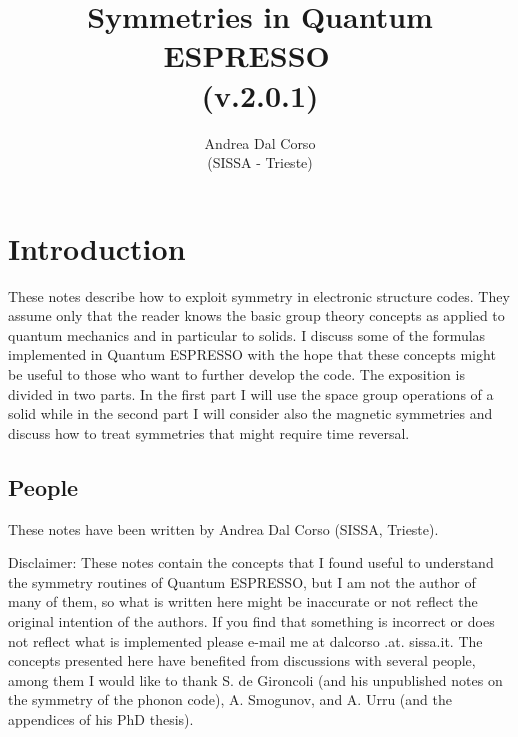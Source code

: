 \documentclass[12pt,a4paper,twoside]{report}
\def\version{2.0.1}
\begin{document}
\author{Andrea Dal Corso \\ (SISSA - Trieste)}
\date{}

\title{
  \vspace{3truecm}
  \Huge \color{dark-blue} Symmetries in Quantum ESPRESSO \ \\
   (v.\version)
}

\maketitle

\newpage

\tableofcontents

\newpage

\newpage
{\color{dark-blue}\chapter{Introduction}}
These notes describe how to exploit symmetry in electronic structure codes. They assume only that the reader knows the basic group theory concepts as applied to quantum mechanics and in particular to solids. I discuss some of the formulas implemented in Quantum ESPRESSO with the hope that these concepts might be useful to those who want to further develop the code. The exposition is divided in two parts. In the first part I will use the space group operations of a solid while in the second part I will consider also the magnetic symmetries and discuss how to treat symmetries that might require time reversal. 


\newpage
\section{People}
These notes have been written by Andrea Dal Corso (SISSA, Trieste). 

Disclaimer: These notes contain the concepts that I found useful to understand the symmetry routines of Quantum ESPRESSO, but I am not the author of many of them, so what is written here might be inaccurate or not reflect the original intention of the authors. If you find that something is incorrect or does not reflect what is implemented please e-mail me at dalcorso .at. sissa.it. 
The concepts presented here have benefited from discussions with several people, among them I would like to thank S. de Gironcoli (and his unpublished notes on the symmetry of the phonon code), A. Smogunov, and A. Urru (and the appendices of his PhD thesis). 
\end{document}
